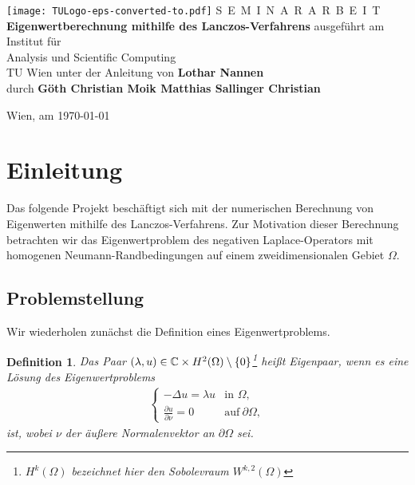 \documentclass{article}
\theoremstyle{plain}
\newtheorem{definition} [theorem]{Definition}
\begin{document}
\begin{titlepage}
	\begin{center}
		\texttt{[image: TULogo-eps-converted-to.pdf]}
		\vskip 1cm%
		{\LARGE S~\Large E~M~I~N~A~R~A~R~B~E~I~T}
		\vskip 8mm
		{\huge\bfseries Eigenwertberechnung mithilfe des Lanczos-Verfahrens}
		\vskip 1cm
		\large
		ausgef\"uhrt am
		\vskip 0.75cm
		{\Large Institut f\"ur\\[1ex] Analysis und Scientific Computing}\\[1ex]
		{\Large TU Wien}
		\vskip0.75cm
		unter der Anleitung von
		\vskip0.75cm
		{\Large\bfseries Lothar Nannen}\\[1ex]
		\vskip 0.5cm
		durch
		\vskip 0.5cm
		{\Large\bfseries Göth Christian \quad Moik Matthias \quad Sallinger Christian}\\[1ex]
	\end{center}

	\vfill

	\small
	Wien, am {\today}
	\vspace*{-15mm}
\end{titlepage}

\newpage
\tableofcontents
\newpage

\pagestyle{headings}

\section{Einleitung}

Das folgende Projekt beschäftigt sich mit der numerischen Berechnung von Eigenwerten mithilfe des Lanczos-Verfahrens. Zur Motivation dieser Berechnung betrachten wir das Eigenwertproblem des negativen Laplace-Operators mit homogenen Neumann-Randbedingungen auf einem zweidimensionalen Gebiet $\Omega$.

\subsection{Problemstellung}

Wir wiederholen zunächst die Definition eines Eigenwertproblems.

\begin{definition}
	Das Paar $(\lambda, u) \in \mathbb{C} \times H^2(\Omega) \setminus \{0\}$\footnote{$H^k(\Omega)$ bezeichnet hier den Sobolevraum $W^{k,2}(\Omega)$} heißt Eigenpaar, wenn es eine Lösung des Eigenwertproblems
	\begin{align}
	    \begin{cases}
	    -\Delta u = \lambda u & \text{in } \Omega, \\
	    \frac{\partial u}{\partial \nu} = 0 & \text{auf}~ \partial\Omega,
	    \end{cases}
	    \label{neumann}
	\end{align}
	ist, wobei $\nu$ der äußere Normalenvektor an $\partial\Omega$ sei.
\end{definition}
\end{document}
